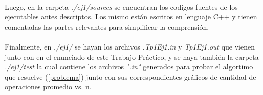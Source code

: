 \paragraph{}
Luego, en la carpeta \textit{./ej1/sources} se encuentran los codigos fuentes de los ejecutables antes descriptos. Los mismo están escritos en lenguaje C++ y tienen comentadas las partes relevantes para simplificar la comprensión.

\paragraph{}
Finalmente, en \textit{./ej1/} se hayan los archivos \textit{.Tp1Ej1.in} y \textit{Tp1Ej1.out} que vienen junto con en el enunciado de este Trabajo Práctico, y se haya también la carpeta \textit{./ej1/test} la cual contiene los archivos \textit{".in"} generados para probar el algortimo que resuelve (\ref{problema}) junto con sus correspondientes gráficos de cantidad de operaciones promedio vs. n.



